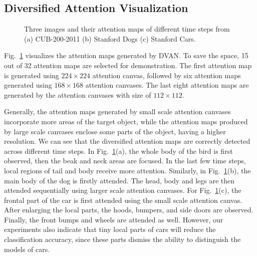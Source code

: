 \documentclass[journal]{IEEEtran}
\begin{document}
\subsection{Diversified Attention Visualization}
\begin{figure}[!t]
  \centering
  \vspace{-0.1in}
  \hfil
  \vspace{-0.1in}
  \hfil
  \hfil
  \caption{Three images and their attention maps of different time steps from (a) CUB-200-2011 (b) Stanford Dogs (c) Stanford Cars.}
  \label{fig:visualization}
  \vspace{-0.2in}
\end{figure}
Fig.~\ref{fig:visualization} visualizes the attention maps generated by DVAN. To save the space, 15 out of 32 attention maps are selected for demonstration. The first attention map is generated using $224\times 224$ attention canvas, followed by six attention maps generated using $168\times 168$ attention canvases. The last eight attention maps are generated by the attention canvases with size of $112 \times 112$.

Generally, the attention maps generated by small scale attention canvases incorporate more areas of the target object, while the attention maps produced by large scale canvases enclose some parts of the object, having a higher resolution. We can see that the diversified attention maps are correctly detected across different time steps. In Fig.~\ref{fig:visualization}(a), the whole body of the bird is first observed, then the beak and neck areas are focused. In the last few time steps, local regions of tail and body receive more attention. Similarly, in Fig.~\ref{fig:visualization}(b), the main body of the dog is firstly attended. The head, body and legs are then attended sequentially using larger scale attention canvases. For Fig.~\ref{fig:visualization}(c), the frontal part of the car is first attended using the small scale attention canvas. After enlarging the local parts, the hoods, bumpers, and side doors are observed. Finally, the front bumps and wheels are attended as well. However, our experiments also indicate that tiny local parts of cars will reduce the classification accuracy, since these parts dismiss the ability to distinguish the models of cars.
\end{document}
